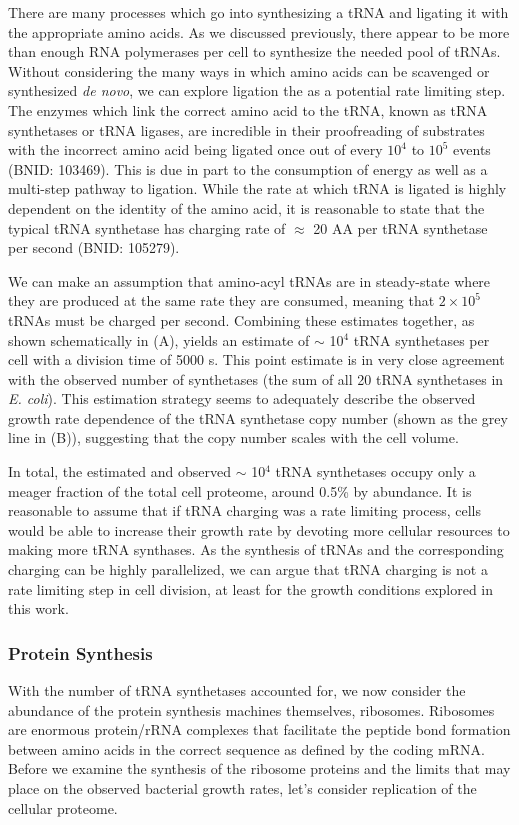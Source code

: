 There are many processes which go into synthesizing a tRNA and ligating it
with the appropriate amino acids. As we discussed previously, there appear to
be more than enough RNA polymerases per cell to synthesize the needed pool of
tRNAs. Without considering the many ways in which amino acids can be
scavenged or synthesized \textit{de novo}, we can explore ligation the as a
potential rate limiting step. The enzymes which link the correct amino acid
to the tRNA, known as tRNA synthetases or tRNA ligases, are incredible in
their proofreading of substrates with the incorrect amino acid being ligated
once out of every $10^4$ to $10^5$ events (BNID: 103469).
This is due in part to the consumption of energy as well as a multi-step
pathway to ligation. While the rate at which tRNA is ligated is highly
dependent on the identity of the amino acid, it is reasonable to state that
the typical tRNA synthetase has charging rate of $\approx$ 20 AA per tRNA
synthetase per second (BNID: 105279).

We can make an assumption that amino-acyl tRNAs are in steady-state where they
are produced at the same rate they are consumed, meaning that $2 \times 10^5$
tRNAs must be charged per second. Combining these estimates together, as shown schematically
in (A), yields an estimate of $\sim$ 10$^4$ tRNA
synthetases per cell with a division time of 5000 s. This point estimate is in
very close agreement with the observed number of synthetases (the sum of all 20
tRNA synthetases in \textit{E. coli}). This estimation strategy seems to
adequately describe the observed growth rate dependence of the tRNA synthetase copy
number (shown as the grey line in (B)), suggesting that
the copy number scales with the cell volume.

In total, the estimated and observed $\sim$ 10$^4$ tRNA synthetases occupy
only a meager fraction of the total cell proteome, around 0.5\% by abundance. It
is reasonable to assume that if tRNA charging was a rate limiting process, cells
would be able to increase their growth rate by devoting more cellular resources
to making more tRNA synthases. As the synthesis of tRNAs and the corresponding
charging can be highly parallelized, we can argue that tRNA charging is not a
rate limiting step in cell division, at least for the growth conditions explored
in this work.

\subsubsection{Protein Synthesis}
With the number of tRNA synthetases accounted for, we now consider the abundance
of the protein synthesis machines themselves, ribosomes. Ribosomes are enormous
protein/rRNA complexes that facilitate the peptide bond formation between amino
acids in the correct sequence as defined by the coding mRNA. Before we examine
the synthesis of the ribosome proteins and the limits that may place on the
observed bacterial growth rates, let's consider replication of the cellular
proteome.

